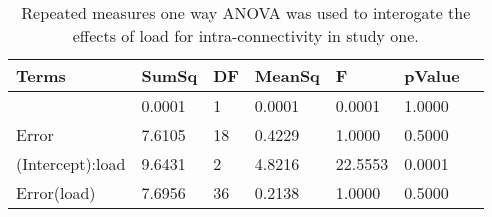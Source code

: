 \begin{table}
\centering
\begin{tabular}[0.2em]{@{}lllllll@{}}\toprule
Terms & SumSq & DF & MeanSq & F & pValue\\\toprule[0.2em]
(Intercept) & 0.0001 & 1 & 0.0001 & 0.0001 & 1.0000 \\\midrule
Error & 7.6105 & 18 & 0.4229 & 1.0000 & 0.5000 \\\midrule
(Intercept):load & 9.6431 & 2 & 4.8216 & 22.5553 & 0.0001 \\\midrule
Error(load) & 7.6956 & 36 & 0.2138 & 1.0000 & 0.5000 \\\bottomrule[0.2em]
\end{tabular}
\caption{Repeated measures one way ANOVA was used to interogate the effects of load for intra-connectivity in study one.\label{tabel:tbl_RMABA1}}
\end{table}
